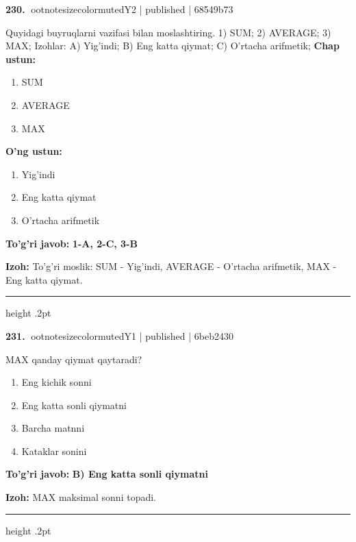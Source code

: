 \documentclass[10pt,a4paper]{article}
\begin{document}
\textbf{\color{ink}230.} {ootnotesizecolor{muted}Y2 | published | 68549b73}
\par
Quyidagi buyruqlarni vazifasi bilan moslashtiring.  1) SUM;  2) AVERAGE;  3) MAX;  Izohlar: A) Yig'indi;  B) Eng katta qiymat;  C) O'rtacha arifmetik;
\textbf{Chap ustun:}\begin{enumerate}[label=\arabic*),leftmargin=9mm]
\item SUM
\item AVERAGE
\item MAX
\end{enumerate}
\textbf{O'ng ustun:}\begin{enumerate}[label=\Alph*),leftmargin=9mm]
\item Yig'indi
\item Eng katta qiymat
\item O'rtacha arifmetik
\end{enumerate}
\begin{tcolorbox}[enhanced,breakable,colback=teal!4,colframe=teal!55!black,boxrule=0.45pt,arc=1.2mm,left=2.8mm,right=2.8mm,top=2mm,bottom=2mm]
\textbf{\color{teal}To'g'ri javob:} \textbf{1-A, 2-C, 3-B}
\par\smallskip
\textbf{Izoh:} To'g'ri moslik: SUM - Yig'indi, AVERAGE - O'rtacha arifmetik, MAX - Eng katta qiymat.
\end{tcolorbox}
\vspace{2mm}\hrule height .2pt\vspace{2mm}

\textbf{\color{ink}231.} {ootnotesizecolor{muted}Y1 | published | 6beb2430}
\par
MAX qanday qiymat qaytaradi?
\begin{enumerate}[label=\Alph*),leftmargin=9mm]
\item Eng kichik sonni
\item Eng katta sonli qiymatni
\item Barcha matnni
\item Kataklar sonini
\end{enumerate}
\begin{tcolorbox}[enhanced,breakable,colback=teal!4,colframe=teal!55!black,boxrule=0.45pt,arc=1.2mm,left=2.8mm,right=2.8mm,top=2mm,bottom=2mm]
\textbf{\color{teal}To'g'ri javob:} \textbf{B) Eng katta sonli qiymatni}
\par\smallskip
\textbf{Izoh:} MAX maksimal sonni topadi.
\end{tcolorbox}
\vspace{2mm}\hrule height .2pt\vspace{2mm}
\end{document}
